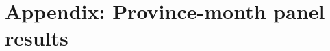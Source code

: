 \documentclass[../main.tex]{subfiles}
\begin{document}
\section{Appendix: Province-month panel results}
\label{sec:appendixc}
\end{document}
